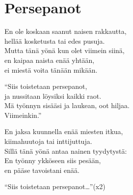 \section{Persepanot}
En ole koskaan saanut naisen rakkautta,\\
hellää kosketusta tai edes pusuja.\\
Mutta tänä yönä kun olet viimein siinä,\\
en kaipaa naista enää yhtään,\\
ei miestä voita tänään mikään.

“Siis toistetaan persepanot,\\
ja nussitaan löysiksi kaikki raot.\\
Mä työnnyn sisääsi ja laukean, oot hiljaa.\\
Viimeinkin.”

En jaksa kuunnella enää miesten itkua,\\
kiimahuutoja tai inttijuttuja.\\
Sillä tänä yönä antaa nainen tyydytystä:\\
En työnny ykköseen siis pesään,\\
en pääse tavoistani enää.

“Siis toistetaan persepanot…”(x2)